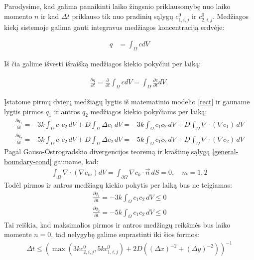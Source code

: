 Parodysime, kad galima panaikinti laiko žingsnio priklausomybę nuo laiko momento $n$ ir kad $\Delta t$ priklauso tik nuo pradinių sąlygų $c^0_{1,i,j}$ ir $c^0_{2,i,j}$. Medžiagos kiekį sistemoje galima gauti integravus medžiagos koncentraciją erdvėje:

\begin{align}
  q&=\int_\Omega c dV \label{quantity-general}
\end{align}

Iš čia galime išvesti išraišką medžiagos kiekio pokyčiui per laiką:

\begin{align}
  \frac{\partial q}{\partial t}=\frac{\partial}{\partial t}\int_\Omega c dV=\int_\Omega\frac{\partial c}{\partial t}dV,
\end{align}

Įstatome pirmų dviejų medžiagų lygtis iš matematinio modelio \eqref{rect} ir gauname lygtis pirmos $q_1$ ir antros $q_2$ medžiagos kiekio pokyčiams per laiką:
\begin{align}
  \frac{\partial q_1}{\partial t}=-3k\int_\Omega c_1c_2\,dV + D\int_\Omega \Delta c_1\,dV=-3k\int_\Omega c_1c_2\,dV + D\int_\Omega \nabla \cdot (\nabla c_1)\,dV\\
  \frac{\partial q_2}{\partial t}=-5k\int_\Omega c_1c_2\,dV + D\int_\Omega \Delta c_2\,dV=-5k\int_\Omega c_1c_2\,dV + D\int_\Omega \nabla \cdot (\nabla c_2)\,dV
\end{align}
\newpage
Pagal Gauso-Ostrogradskio divergencijos teoremą ir kraštinę sąlygą \eqref{general-boundary-cond} gauname, kad:
\begin{align}\label{no-q-change}
\int_\Omega \nabla \cdot (\nabla c_m) dV = \int_{\partial\Omega} \nabla c_k \cdot \vec{n}\, dS = 0,\quad m=1,2
\end{align}
Todėl pirmos ir antros medžiagų kiekio pokytis per laiką bus ne teigiamas:
\begin{subequations} \label{negative-quantity}
\begin{align}
  \frac{\partial q_1}{\partial t}=-3k\int_\Omega c_1c_2\,dV \leqslant 0\\
  \frac{\partial q_2}{\partial t}=-5k\int_\Omega c_1c_2\,dV\leqslant 0
\end{align}
\end{subequations}
Tai reiškia, kad maksimalios pirmos ir antros medžiagų reikšmės bus laiko momente $n=0$, tad nelygybę galime suprastinti iki šios formos:
\begin{align}
  \Delta t \leqslant \left(\max(3kc^{0}_{2,i,j}, 5kc^{0}_{1,i,j})+2D\left((\Delta x)^{-2}+(\Delta y)^{-2}\right)\right)^{-1}
\end{align}

